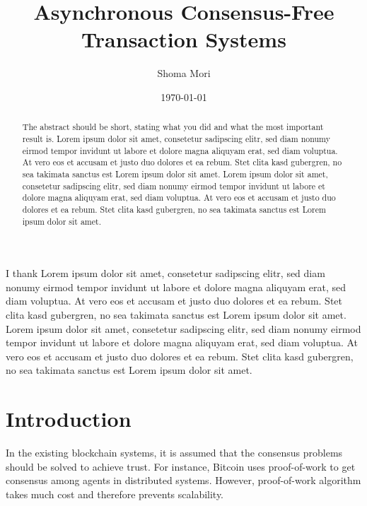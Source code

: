 \documentclass[a4paper, oneside]{discothesis}
\title{Asynchronous Consensus-Free Transaction Systems}
\author{Shoma Mori}
\institute{Distributed Computing Group \\[2pt]
Computer Engineering and Networks Laboratory \\[2pt]
ETH Zürich}
\date{\today}
\begin{document}
\frontmatter %
\maketitle

\cleardoublepage

\begin{acknowledgements}
	I thank Lorem ipsum dolor sit amet, consetetur sadipscing elitr, sed diam nonumy eirmod tempor invidunt ut labore et dolore magna aliquyam erat, sed diam voluptua. At vero eos et accusam et justo duo dolores et ea rebum. Stet clita kasd gubergren, no sea takimata sanctus est Lorem ipsum dolor sit amet. Lorem ipsum dolor sit amet, consetetur sadipscing elitr, sed diam nonumy eirmod tempor invidunt ut labore et dolore magna aliquyam erat, sed diam voluptua. At vero eos et accusam et justo duo dolores et ea rebum. Stet clita kasd gubergren, no sea takimata sanctus est Lorem ipsum dolor sit amet.
\end{acknowledgements}


\begin{abstract}
    The abstract should be short, stating what you did and what the most important result is.
	Lorem ipsum dolor sit amet, consetetur sadipscing elitr, sed diam nonumy eirmod tempor invidunt ut labore et dolore magna aliquyam erat, sed diam voluptua. At vero eos et accusam et justo duo dolores et ea rebum. Stet clita kasd gubergren, no sea takimata sanctus est Lorem ipsum dolor sit amet. Lorem ipsum dolor sit amet, consetetur sadipscing elitr, sed diam nonumy eirmod tempor invidunt ut labore et dolore magna aliquyam erat, sed diam voluptua. At vero eos et accusam et justo duo dolores et ea rebum. Stet clita kasd gubergren, no sea takimata sanctus est Lorem ipsum dolor sit amet.
\end{abstract}

\tableofcontents

\mainmatter %

\chapter{Introduction}

In the existing blockchain systems, it is assumed that the consensus problems
should be solved to achieve trust.
For instance, Bitcoin uses proof-of-work to get consensus among agents in distributed systems.
However, proof-of-work algorithm takes much cost and therefore prevents scalability.
\end{document}
